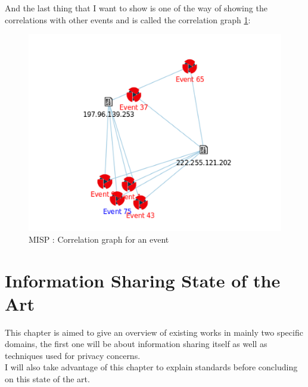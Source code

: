 \documentclass{eplmastersthesis}
\begin{document}
And the last thing that I want to show is one of the way of showing the correlations with other events and is called the correlation graph \ref{webcorrelation}:
\begin{figure}[!h]
	\begin{center}
		\includegraphics[scale=0.35]{res/webCorrelationGraph}
		\caption{MISP : Correlation graph for an event}
		\label{webcorrelation}
	\end{center}
\end{figure}



\chapter{Information Sharing State of the Art}

This chapter is aimed to give an overview of existing works in mainly two specific domains, the first one will be about information sharing itself as well as techniques used for privacy concerns.\\
I will also take advantage of this chapter to explain standards before concluding on this state of the art.
\end{document}
